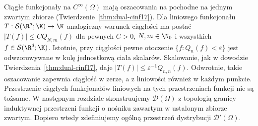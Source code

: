 \begin{uwaga}
\label{rem:distribution-next17}
Ciągłe funkcjonały na $C^\infty(\Omega)$ mają oszacowania
na pochodne na jednym zwartym zbiorze (Twierdzenie~\ref{thm:dual-cinf17}).
Dla liniowego funkcjonału $T:\mathcal S(\R^d;\K)\to\K$
analogiczny warunek ciągłości ma postać
$|T(f)|\le C Q_{N,m}(f)$ dla pewnych $C>0$, $N,m\in\N_0$
i wszystkich $f\in\mathcal S(\R^d;\K)$.
Istotnie, przy ciągłości pewne otoczenie
$\{f:Q_n(f)<\varepsilon\}$ jest odwzorowywane w kulę jednostkową
ciała skalarów. Skalowanie, jak w dowodzie
Twierdzenia~\ref{thm:dual-cinf17}, daje
$|T(f)|\le\varepsilon^{-1}Q_{n,n}(f)$.
Odwrotnie, takie oszacowanie zapewnia ciągłość w zerze,
a z liniowości również w każdym punkcie.
Przestrzenie ciągłych funkcjonałów liniowych na tych
przestrzeniach funkcji nie są tożsame.
W następnym rozdziale skonstruujemy $\mathcal D(\Omega)$
z topologią granicy induktywnej przestrzeni funkcji o nośniku
zawartym w ustalonym zbiorze zwartym. Dopiero wtedy zdefiniujemy
ogólną przestrzeń dystrybucji $\mathcal D'(\Omega)$.
\end{uwaga}
